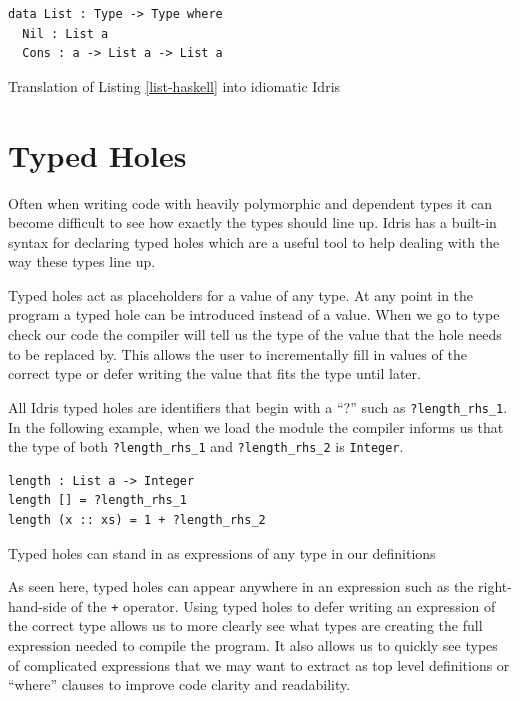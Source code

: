 \documentclass[a4paper, notitlepage]{report}
\begin{document}
\begin{listing}[H]
\begin{verbatim}
data List : Type -> Type where
  Nil : List a
  Cons : a -> List a -> List a
\end{verbatim}
\caption{Translation of Listing \ref{list-haskell} into idiomatic Idris}
\end{listing}

\section{Typed Holes}
\label{sec:orgfc998a0}
Often when writing code with heavily polymorphic and dependent types it can
become difficult to see how exactly the types should line up. Idris has a
built-in syntax for declaring typed holes which are a useful tool to help
dealing with the way these types line up.

Typed holes act as placeholders for a value of any type. At any point in the
program a typed hole can be introduced instead of a value. When we go to type
check our code the compiler will tell us the type of the value that the hole
needs to be replaced by. This allows the user to incrementally fill in values of
the correct type or defer writing the value that fits the type until later.

All Idris typed holes are identifiers that begin with a ``?'' such as
\texttt{?length\_rhs\_1}. In the following example, when we load the module the compiler
informs us that the type of both \texttt{?length\_rhs\_1} and \texttt{?length\_rhs\_2} is \texttt{Integer}.

\begin{listing}[H]
\begin{verbatim}
length : List a -> Integer
length [] = ?length_rhs_1
length (x :: xs) = 1 + ?length_rhs_2
\end{verbatim}
\caption{Typed holes can stand in as expressions of any type in our definitions}
\end{listing}

As seen here, typed holes can appear anywhere in an expression such as the
right-hand-side of the \texttt{+} operator. Using typed holes to defer writing an
expression of the correct type allows us to more clearly see what types are
creating the full expression needed to compile the program. It also allows us to
quickly see types of complicated expressions that we may want to extract as top
level definitions or ``where'' clauses to improve code clarity and readability.
\end{document}
